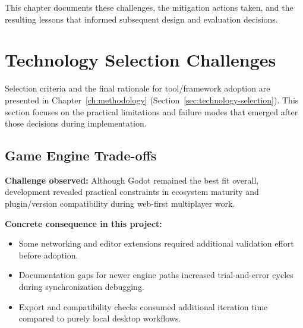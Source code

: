 This chapter documents these challenges, the mitigation actions taken, and the resulting lessons that informed subsequent design and evaluation decisions.

\section{Technology Selection Challenges}
\label{sec:technology-challenges}

Selection criteria and the final rationale for tool/framework adoption are presented in Chapter~\ref{ch:methodology} (Section~\ref{sec:technology-selection}). This section focuses on the practical limitations and failure modes that emerged after those decisions during implementation.

\subsection{Game Engine Trade-offs}
\label{subsec:engine-tradeoffs}


\textbf{Challenge observed:}
Although Godot remained the best fit overall, development revealed practical constraints in ecosystem maturity and plugin/version compatibility during web-first multiplayer work.

\textbf{Concrete consequence in this project:}
\begin{itemize}
    \item Some networking and editor extensions required additional validation effort before adoption.
    \item Documentation gaps for newer engine paths increased trial-and-error cycles during synchronization debugging.
    \item Export and compatibility checks consumed additional iteration time compared to purely local desktop workflows.
\end{itemize}

